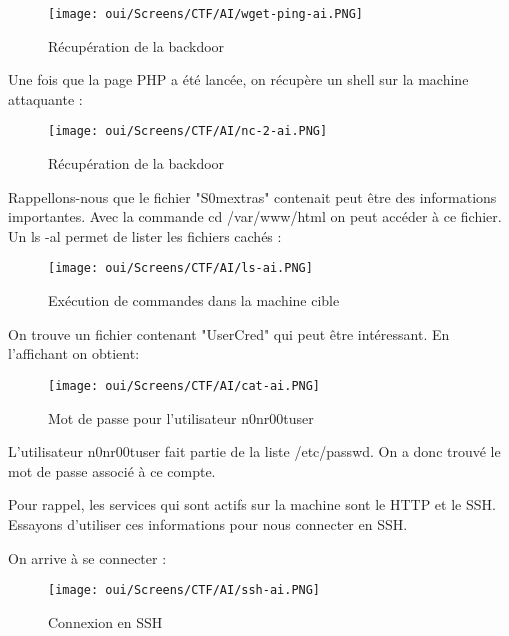 \begin{figure}[htp!]
  \centering
  \setlength\figureheight{7cm}
  \setlength\figurewidth{9cm}
  \texttt{[image: oui/Screens/CTF/AI/wget-ping-ai.PNG]}   
  \caption{Récupération de la backdoor}
  \label{fig:courbe-tikz}
\end{figure}

\noindent Une fois que la page PHP a été lancée, on récupère un shell sur la machine attaquante :

\begin{figure}[htp!]
  \centering
  \setlength\figureheight{7cm}
  \setlength\figurewidth{9cm}
  \texttt{[image: oui/Screens/CTF/AI/nc-2-ai.PNG]}   
  \caption{Récupération de la backdoor}
  \label{fig:courbe-tikz}
\end{figure}

\noindent Rappellons-nous que le fichier "S0mextras" contenait peut être des informations importantes. Avec la commande cd /var/www/html on peut accéder à ce fichier. Un ls -al permet de lister les fichiers cachés :

\begin{figure}[htp!]
  \centering
  \setlength\figureheight{7cm}
  \setlength\figurewidth{9cm}
  \texttt{[image: oui/Screens/CTF/AI/ls-ai.PNG]}   
  \caption{Exécution de commandes dans la machine cible}
  \label{fig:courbe-tikz}
\end{figure}

\noindent On trouve un fichier contenant "UserCred" qui peut être intéressant. En l'affichant on obtient:

\begin{figure}[htp!]
  \centering
  \setlength\figureheight{7cm}
  \setlength\figurewidth{9cm}
  \texttt{[image: oui/Screens/CTF/AI/cat-ai.PNG]}   
  \caption{Mot de passe pour l'utilisateur n0nr00tuser}
  \label{fig:courbe-tikz}
\end{figure}

\noindent L'utilisateur n0nr00tuser fait partie de la liste /etc/passwd. On a donc trouvé le mot de passe associé à ce compte.

\noindent Pour rappel, les services qui sont actifs sur la machine sont le HTTP et le SSH. Essayons d'utiliser ces informations pour nous connecter en SSH.

\newpage
\noindent On arrive à se connecter :

\begin{figure}[htp!]
  \centering
  \setlength\figureheight{7cm}
  \setlength\figurewidth{9cm}
  \texttt{[image: oui/Screens/CTF/AI/ssh-ai.PNG]}   
  \caption{Connexion en SSH}
  \label{fig:courbe-tikz}
\end{figure}

